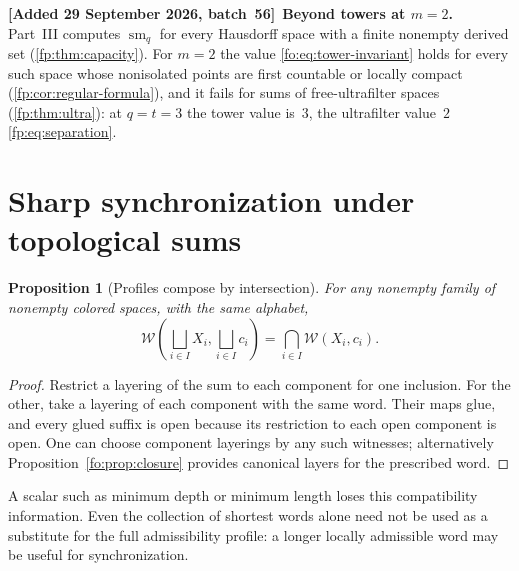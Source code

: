 \documentclass[11pt,letterpaper]{article}
\numberwithin{equation}{section}
\newtheorem{proposition}[proposition]{Proposition}
\theoremstyle{definition}
\theoremstyle{remark}
\theoremstyle{definition}
\newcommand{\W}{\mathcal W}
\newcommand{\smq}{\operatorname{sm}_{q}}
\newenvironment{writenotec}[1][]{\par\smallskip\begingroup\small\sloppy
 \noindent\textbf{[Added 29 September 2026, batch~56]}\if\relax\detokenize{#1}\relax\else~\textbf{#1.}\fi\ }%
 {\par\endgroup\smallskip}
\begin{document}
\begin{writenotec}[Beyond towers at $m=2$]
Part~III computes $\smq$ for every Hausdorff space with a finite nonempty
derived set (\cref{fp:thm:capacity}). For $m=2$ the value
\eqref{fo:eq:tower-invariant} holds for every such space whose nonisolated
points are first countable or locally compact
(\cref{fp:cor:regular-formula}), and it fails for sums of free-ultrafilter
spaces (\cref{fp:thm:ultra}): at $q=t=3$ the tower value is~$3$, the
ultrafilter value~$2$ \eqref{fp:eq:separation}.
\end{writenotec}

\section{Sharp synchronization under topological sums}
\label{fo:sec:sums}

\begin{proposition}[Profiles compose by intersection]\label{fo:prop:sum-profile}
For any nonempty family of nonempty colored spaces, with the same alphabet,
\begin{equation}\label{fo:eq:sum-profile}
 \W\!\left(\bigsqcup_{i\in I}X_i,\bigsqcup_{i\in I}c_i\right)
 =\bigcap_{i\in I}\W(X_i,c_i).
\end{equation}
\end{proposition}
\begin{proof}
Restrict a layering of the sum to each component for one inclusion. For the
other, take a layering of each component with the same word. Their maps glue,
and every glued suffix is open because its restriction to each open component
is open. One can choose component layerings by any such witnesses; alternatively
Proposition~\ref{fo:prop:closure} provides canonical layers for the prescribed word.
\end{proof}

A scalar such as minimum depth or minimum length loses this compatibility
information. Even the collection of shortest words alone need not be used as a
substitute for the full admissibility profile: a longer locally admissible word
may be useful for synchronization.
\end{document}
